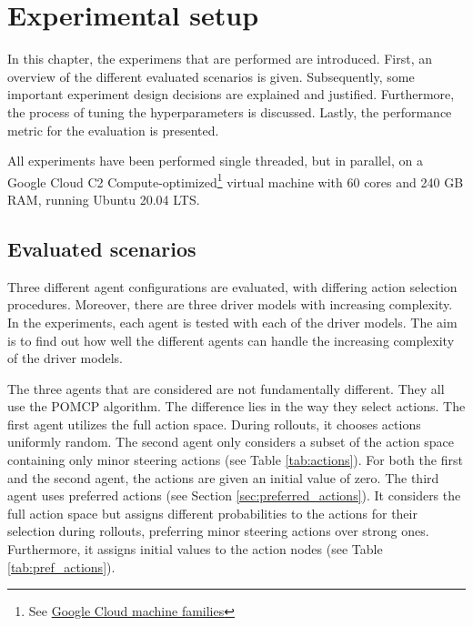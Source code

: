 \chapter{Experimental setup}
\label{sec:setup}



In this chapter, the experimens that are performed are introduced. First, an overview of the different evaluated scenarios is given. Subsequently, some important experiment design decisions are explained and justified. Furthermore, the process of tuning the hyperparameters is discussed. Lastly, the performance metric for the evaluation is presented.

All experiments have been performed single threaded, but in parallel, on a Google Cloud C2 Compute-optimized\footnote{See \href{https://cloud.google.com/compute/docs/machine-types}{Google Cloud machine families}} virtual machine with 60 cores and 240 GB RAM, running Ubuntu 20.04 LTS.



\section{Evaluated scenarios}

Three different agent configurations are evaluated, with differing action selection procedures. Moreover, there are three driver models with increasing complexity. In the experiments, each agent is tested with each of the driver models. The aim is to find out how well the different agents can handle the increasing complexity of the driver models.

The three agents that are considered are not fundamentally different. They all use the POMCP algorithm. The difference lies in the way they select actions. The first agent utilizes the full action space. During rollouts, it chooses actions uniformly random. The second agent only considers a subset of the action space containing only minor steering actions (see Table \ref{tab:actions}). For both the first and the second agent, the actions are given an initial value of zero. The third agent uses preferred actions (see Section \ref{sec:preferred_actions}). It considers the full action space but assigns different probabilities to the actions for their selection during rollouts, preferring minor steering actions over strong ones. Furthermore, it assigns initial values to the action nodes (see Table \ref{tab:pref_actions}).

